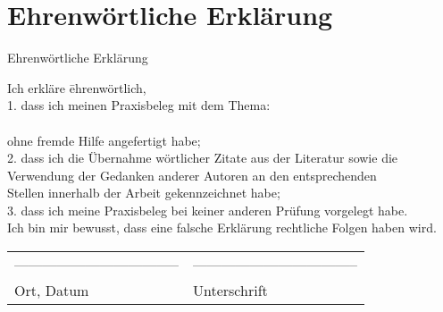 

\cleardoublepage 
\section{Ehrenwörtliche Erklärung}
\begin{bfseries}
	\begin{center}
		\Huge{Ehrenwörtliche Erklärung}\\[3cm]
	\end{center}
\end{bfseries}
			\begin{tabbing}
		Ich erkläre \= ehrenwörtlich,\\[1cm]
		1. 	\> dass ich meinen Praxisbeleg mit dem Thema:\\[1cm]
		   	\> \titel\\[1cm]
		ohne fremde Hilfe angefertigt habe;\\[1cm]
		
		2.	\> dass ich die Übernahme wörtlicher Zitate aus der Literatur sowie die\\ 		  
			\>Verwendung der Gedanken anderer Autoren an den entsprechenden\\
			\> Stellen innerhalb der Arbeit gekennzeichnet habe;\\[0.5cm]
		
		3.	\> dass ich meine Praxisbeleg bei keiner anderen Prüfung vorgelegt habe. \\[1cm]
		Ich bin mir bewusst, dass eine falsche Erklärung rechtliche Folgen haben wird. \\[2cm]
		\end{tabbing}
		
		 \begin{tabular}{p{8cm}l}
		  ----------------------------------- &  ----------------------------------- \\
		  Ort, Datum & Unterschrift  \\
		 \end{tabular}